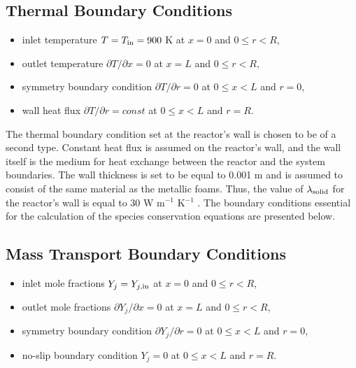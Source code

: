 \documentclass[preprint,12pt]{elsarticle}
\begin{document}
\subsection*{Thermal Boundary Conditions}
\begin{itemize}
  \item inlet temperature $T = T_{\rm{in}} = 900$ K \hspace*{\fill} \hfill at $x = 0$ and $0 \leq r < R$,
  \item outlet temperature $\partial T / \partial x = 0$ \hspace*{\fill} \hfill at $x = L$ and $0 \leq r < R$,
  \item symmetry boundary condition $\partial T / \partial r = 0$ \hspace*{\fill} \hfill at $0 \leq x < L$ and $r = 0$,
  \item wall heat flux $\partial T / \partial r =  const$ \hspace*{\fill} \hfill at $0 \leq x < L$ and $r = R$.
\end{itemize}

The thermal boundary condition set at the reactor's wall is chosen to be of a second type. Constant heat flux is assumed on the reactor's wall, and the wall itself is the medium for heat exchange between the reactor and the system boundaries. The wall thickness is set to be equal to 0.001 m and is assumed to consist of the same material as the metallic foams. Thus, the value of $\lambda_{\rm{solid}}$ for the reactor's wall is equal to  30 W m$^{-1}$ K$^{-1}$ \cite{Peet2011}. The boundary conditions essential for the calculation of the species conservation equations are presented below. 

\subsection*{Mass Transport Boundary Conditions}
\begin{itemize}
  \item inlet mole fractions $Y_j = Y_{j,\rm{in}}$ \hspace*{\fill}  at $x = 0$ and $0 \leq r < R$,
  \item outlet mole fractions $\partial Y_j / \partial x = 0$ \hspace*{\fill} \hfill at $x = L$ and $0 \leq r < R$,
  \item symmetry boundary condition $\partial Y_j / \partial r = 0$ \hspace*{\fill} \hfill at $0 \leq x < L$ and $r = 0$,
  \item no-slip boundary condition $Y_j = 0$ \hspace*{\fill} \hfill at $0 \leq x < L$ and $r = R$.
\end{itemize}
\end{document}

